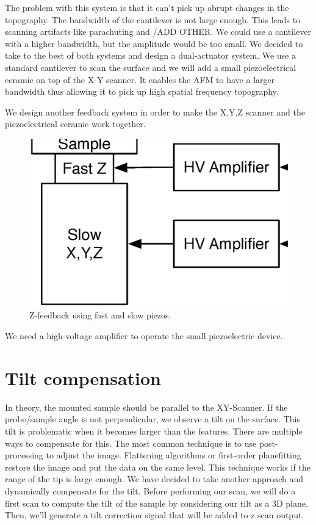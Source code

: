 The problem with this system is that it can't pick up abrupt changes in the topography.\cite{jeong:093706} The bandwidth of the cantilever is not large enough. This leads to scanning artifacts like parachuting and /ADD OTHER. We could use a cantilever with a higher bandwidth, but the amplitude would be too small. We decided to take to the best of both systems and design a dual-actuator system. We use a standard cantilever to scan the surface and we will add a small piezoelectrical ceramic on top of the X-Y scanner. It enables the AFM to have a larger bandwidth thus allowing it to pick up high spatial frequency topography. 

We design another feedback system in order to make the X,Y,Z scanner and the piezoelectrical ceramic work together. \cite{el2004dual}

\begin{figure}[H]
  \centering
  \includegraphics[scale=0.3]{images/doublePID.eps}
    \caption{Z-feedback using fast and slow piezos.}
  \label{DoublePid}
\end{figure}

We need a high-voltage amplifier to operate the small piezoelectric device. 

\section{Tilt compensation}
\label{sec:tiltcompensation}

In theory, the mounted sample should be parallel to the XY-Scanner. If the probe/sample angle is not perpendicular, we observe a tilt on the surface. This tilt is problematic when it becomes larger than the features. There are multiple ways to compensate for this. The most common technique is to use post-processing to adjust the image. Flattening algorithms or first-order planefitting restore the image and put the data on the same level. This technique works if the range of the tip is large enough. We have decided to take another approach and dynamically compensate for the tilt. Before performing our scan, we will do a first scan to compute the tilt of the sample by considering our tilt as a 3D plane. Then, we'll generate a tilt correction signal that will be added to z scan output.

